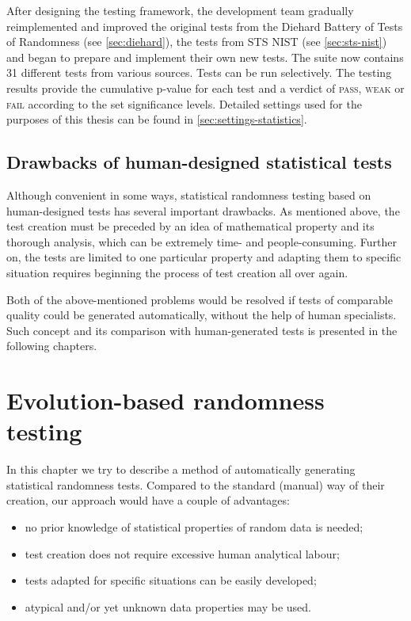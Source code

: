 \documentclass[12pt,oneside]{fithesis2}
\begin{document}
After designing the testing framework, the development team gradually reimplemented and improved the original tests from 
the Diehard Battery of Tests of Randomness (see \autoref{sec:diehard}), 
the tests from STS NIST (see \autoref{sec:sts-nist}) and began to prepare and implement their own new tests.
The suite now contains 31 different tests from various sources. Tests can be run selectively.
The testing results provide the cumulative p-value for each test and a verdict of \textsc{pass}, \textsc{weak} or \textsc{fail}
according to the set significance levels.
Detailed settings used for the purposes of this thesis can be found in \autoref{sec:settings-statistics}.

\section{Drawbacks of human-designed statistical tests}
\label{sec:limits-stat-testing}

Although convenient in some ways, statistical randomness testing based on human-designed tests has several important drawbacks.
As mentioned above, the test creation must be preceded by an idea of mathematical property and its thorough analysis, 
which can be extremely time- and people-consuming. Further on, the tests are limited to one particular property and
adapting them to specific situation requires beginning the process of test creation all over again.

Both of the above-mentioned problems would be resolved if tests of comparable quality could be generated automatically, without 
the help of human specialists. Such concept and its comparison with human-generated tests is presented in the following chapters.

\chapter{Evolution-based randomness testing}
\label{chap:evo-based-testing}

In this chapter we try to describe a method of automatically generating statistical randomness tests. Compared to the standard
(manual) way of their creation, our approach would have a couple of advantages: 
\begin{itemize}
\item no prior knowledge of statistical properties of random data is needed;
\item test creation does not require excessive human analytical labour;
\item tests adapted for specific situations can be easily developed;
\item atypical and/or yet unknown data properties may be used.
\end{itemize}
\end{document}
